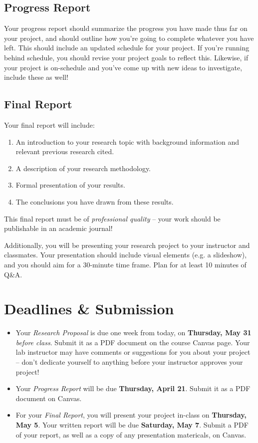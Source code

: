 \documentclass[11pt]{cselabheader}
\begin{document}
\subsection{Progress Report}
Your progress report should summarize the progress you have made thus far on your project, and should outline how you're going to complete whatever you have left. This should include an updated schedule for your project. If you're running behind schedule, you should revise your project goals to reflect this. Likewise, if your project is on-schedule and you've come up with new ideas to investigate, include these as well!

\subsection{Final Report}
Your final report will include:
\begin{enumerate}
  \item An introduction to your research topic with background information and relevant previous research cited.
  \item A description of your research methodology.
  \item Formal presentation of your results.
  \item The conclusions you have drawn from these results.
\end{enumerate}
This final report must be of \emph{professional quality} -- your work should be publishable in an academic journal!

Additionally, you will be presenting your research project to your instructor and classmates. Your presentation should include visual elements (e.g. a slideshow), and you should aim for a 30-minute time frame. Plan for at least 10 minutes of Q\&A.

\pagebreak

\section{Deadlines \& Submission}
\begin{itemize}
  \item Your \emph{Research Proposal} is due one week from today, on
  \textbf{Thursday, May 31} \emph{before class}. Submit it as a PDF document on
  the course Canvas page. Your lab instructor may have comments or suggestions
  for you about your project -- don't dedicate yourself to anything before your
  instructor approves your project!

  \item Your \emph{Progress Report} will be due \textbf{Thursday, April 21}. Submit it
  as a PDF document on Canvas.

  \item For your \emph{Final Report}, you will present your project in-class on
  \textbf{Thursday, May 5}. Your written report will be due \textbf{Saturday, May
    7}. Submit a PDF of your report, as well as a copy of any presentation
  matericals, on Canvas.
\end{itemize}
\end{document}
